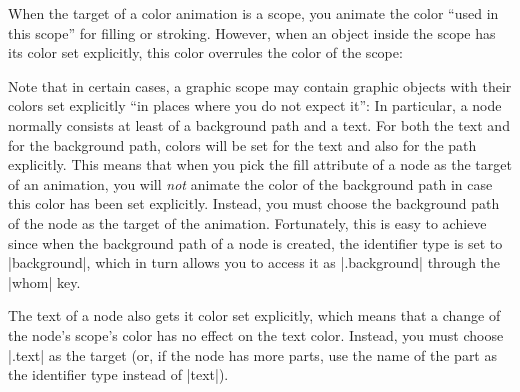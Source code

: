 \begin{codeexample}[width=2.3cm]
\end{codeexample}

\begin{codeexample}[width=2.3cm]
\end{codeexample}

When the target of a color animation is a scope, you animate
the color ``used in this scope'' for filling or stroking. However,
when an object inside the scope has its color set explicitly, this
color overrules the color of the scope:

\begin{codeexample}[]
\end{codeexample}

Note that in certain cases, a graphic scope may contain graphic
objects with their colors set explicitly ``in places where you do not
expect it'': In particular, a node normally consists at least of a
background path and a text. For both the text and for the background
path, colors will be set for the text and also for the path
explicitly. This means that when you pick the fill attribute of a node
as the target of an animation, you will \emph{not} animate the color
of the background path in case this color has been set
explicitly. Instead, you must choose the background path of the node
as the target of the animation. Fortunately, this is easy to achieve
since when the background path of a node is created, the identifier
type is set to |background|, which in turn allows you to access it as
|.background| through the |whom| key.

The text of a node also gets it color set explicitly, which means that
a change of the node's scope's color has no effect on the text
color. Instead, you must choose |.text| as the target (or,
if the node has more parts, use the name of the part as the identifier
type instead of |text|).

